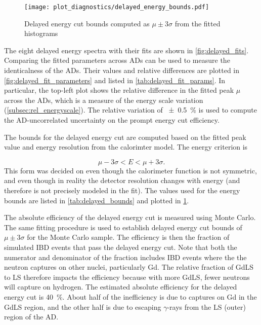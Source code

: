 \begin{figure}
    \centering
    \texttt{[image: plot\_diagnostics/delayed\_energy\_bounds.pdf]}
    \caption{
        Delayed energy cut bounds computed as $\mu\pm 3\sigma$
        from the fitted histograms
    }
    \label{fig:delayed_bounds}
\end{figure}

The eight delayed energy spectra with their fits are shown in \cref{fig:delayed_fits}.
Comparing the fitted parameters across ADs can be used
to measure the identicalness of the ADs.
Their values and relative differences are plotted in \cref{fig:delayed_fit_parameters}
and listed in \cref{tab:delayed_fit_params}.
In particular, the top-left plot shows the relative difference
in the fitted peak $\mu$ across the ADs,
which is a measure of the energy scale variation (\cref{subsec:rel_energyscale}).
The relative variation of \SI{+-0.5}{\percent}
is used to compute the AD-uncorrelated uncertainty
on the prompt energy cut efficiency.

The bounds for the delayed energy cut are computed
based on the fitted peak value and energy resolution
from the calorimter model. The energy criterion is

\begin{equation}
    \mu - 3\sigma < E < \mu + 3\sigma.
\end{equation}
This form was decided on even though the calorimeter function
is not symmetric, and even though in reality
the detector resolution changes with energy
(and therefore is not precisely modeled in the fit).
The values used for the energy bounds are listed in \cref{tab:delayed_bounds}
and plotted in \cref{fig:delayed_bounds}.

The absolute efficiency of the delayed energy cut
is measured using Monte Carlo.
The same fitting procedure is used to establish
delayed energy cut bounds of $\mu \pm 3\sigma$ for the Monte Carlo sample.
The efficiency is then the fraction of simulated IBD events
that pass the delayed energy cut.
Note that both the numerator and denominator of the fraction includes IBD events
where the the neutron captures on other nuclei, particularly Gd.
The relative fraction of GdLS to LS therefore impacts the efficiency
because with more GdLS, fewer neutrons will capture on hydrogen.
The estimated absolute efficiency for the delayed energy cut
is \SI{40}{\percent}.
About half of the inefficiency is due to captures on Gd in the GdLS region,
and the other half is due to escaping $\gamma$-rays
from the LS (outer) region of the AD.

